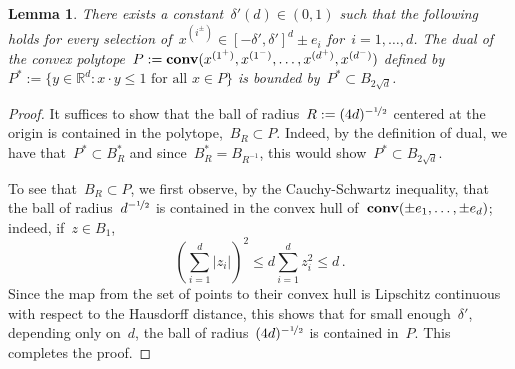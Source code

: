 \documentclass[12pt]{amsart}
\numberwithin{equation}{section}
\DeclareMathOperator{\conv}{\mathop{\bf conv}}
\newtheorem{lemma}[theorem]{Lemma}
\newcommand*{\Rd}{\ensuremath{\mathbb{R}^d}}
\begin{document}
\begin{lemma} \label{lemma:dual-polytope-bound}
	There exists a constant~$\delta'(d) \in (0,1)$ such that the following holds for every selection of~$x^{(i^{\pm})} \in [-\delta', \delta']^d \pm e_i$ for~$i = 1, \ldots, d$.
	The dual of the convex polytope~$P := \conv(x^{(1^+)}, x^{(1^-)}, \ldots, x^{(d^+)}, x^{(d^-)})$ defined by~$P^* := \{ y \in \Rd: x \cdot y \leq 1 \mbox{ for all~$x \in P$}\}$ is bounded by~$P^* \subset B_{2 \sqrt{d}}$. 
\end{lemma}
\begin{proof}
	It suffices to show that the ball of radius~$R := (4 d)^{-\nicefrac12}$ centered at the origin is contained in the polytope,~$B_R \subset P$. Indeed, 
	by the definition of dual, we have that~$P^* \subset B_R^*$ and since~$B_R^* = B_{R^{-1}}$, this would show~$P^* \subset B_{2 \sqrt{d}}$. 
	

	To see that~$B_R \subset P$, we first observe, by the Cauchy-Schwartz inequality, that the ball of radius~$d^{-\nicefrac12}$ is contained in
	the convex hull of~$ \conv(\pm e_1, \ldots, \pm e_d)$; indeed, if~$z \in B_1$, 
	\[
	\left( \sum_{i=1}^d |z_i| \right)^2 \leq  d \sum_{i=1}^d z_i^2  \leq  d   \, .  
	\]
	Since the map from the set of points to their convex hull 
	is Lipschitz continuous with respect to the Hausdorff distance, 
	this shows that for small enough~$\delta'$, depending only
	on~$d$, the ball of radius~$(4 d)^{-\nicefrac12}$ is contained in~$P$. This completes the proof.
\end{proof}
\end{document}
